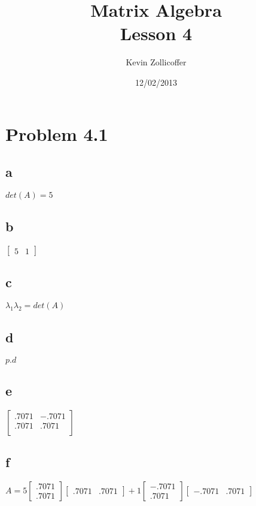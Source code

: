 \documentclass{article}
\author{Kevin Zollicoffer}
\title{Matrix Algebra\\Lesson 4}
\date{12/02/2013}
\begin{document}
\maketitle


\section*{Problem 4.1}
\subsection*{a}
$ det(A) = 5$

\subsection*{b}
$  
\begin{bmatrix}
  5 & 1
\end{bmatrix}
$

\subsection*{c}
$\lambda_1\lambda_2 = det(A)$

\subsection*{d}
$p.d$

\subsection*{e}
$  
\begin{bmatrix}
  .7071 & -.7071 \\
  .7071 & .7071 \\
\end{bmatrix}
$

\subsection*{f}
$A = 5   
\begin{bmatrix}
  .7071 \\
  .7071
\end{bmatrix}
\begin{bmatrix}
  .7071 & .7071
\end{bmatrix}
+
1
\begin{bmatrix}
  -.7071 \\
  .7071
\end{bmatrix}
\begin{bmatrix}
  -.7071 & .7071
\end{bmatrix}
$
\end{document}
